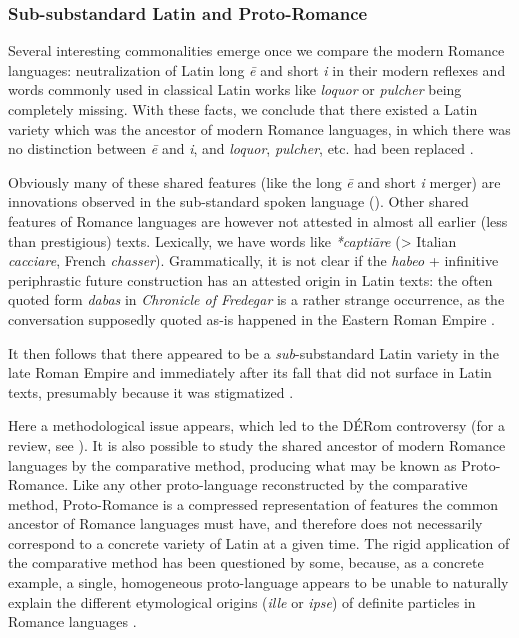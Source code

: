 \documentclass[a4paper, oneside, 12pt]{report}
\newcommand*{\citepage}[1]{p.~{#1}}
\newcommand*{\citepages}[1]{pp.~{#1}}
\newcommand{\form}[1]{\emph{#1}}
\newcommand{\literature}[1]{\textit{#1}}
\begin{document}
\subsubsection{Sub-substandard Latin and Proto-Romance}

Several interesting commonalities emerge once we compare the modern Romance languages:
neutralization of Latin long \form{\={e}} and short \form{i}
in their modern reflexes
and words commonly used in classical Latin works like \form{loquor} or \form{pulcher}
being completely missing.
With these facts, we conclude that there existed a Latin variety which was the ancestor of modern Romance languages, in which there was no distinction between \form{\={e}} and \form{i}, 
and \form{loquor}, \form{pulcher}, etc. had been replaced
\citep[\citepages{1-3}]{herman2010vulgar}.

Obviously many of these shared features (like the long \form{\={e}} and short \form{i} merger) are innovations observed in the sub-standard spoken language ().
Other shared features of Romance languages are however not attested in almost all earlier (less than prestigious) texts.
Lexically, we have words like \form{*captiāre} (> Italian \form{cacciare}, French \form{chasser}). 
Grammatically, it is not clear if the \form{habeo} + infinitive periphrastic future construction has an attested origin in Latin texts:
the often quoted form \form{dabas} in \literature{Chronicle of Fredegar} is a rather strange occurrence, as the conversation supposedly quoted as-is happened in the Eastern Roman Empire
\citep[\citepage{33-34}]{alkire2010romance}.

It then follows that there appeared to be a \emph{sub}-substandard Latin variety in the late Roman Empire and immediately after its fall that did not surface in Latin texts, presumably because it was stigmatized
\citep[\citepage{27}]{alkire2010romance}.

Here a methodological issue appears, which led to the DÉRom controversy (for a review, see \citealt{dworkin2016proto}). 
It is also possible to study the shared ancestor of modern Romance languages by the comparative method, producing what may be known as Proto-Romance.
Like any other proto-language reconstructed by the comparative method, Proto-Romance is a compressed representation of features the common ancestor of Romance languages must have, and therefore does not necessarily correspond to a concrete variety of Latin at a given time.
The rigid application of the comparative method has been questioned by some, because, as a concrete example, a single, homogeneous proto-language appears to be unable to naturally explain the different etymological origins (\form{ille} or \form{ipse}) of definite particles in Romance languages \citep[\citepage{28,35}]{alkire2010romance}.
\end{document}
